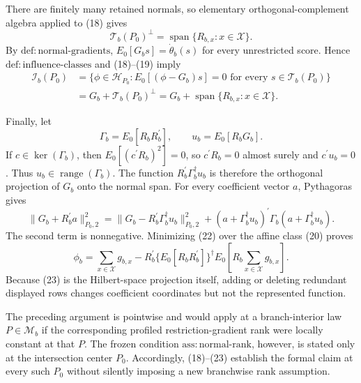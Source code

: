 There are finitely many retained normals, so elementary orthogonal-complement algebra applied to (18) gives
\[
 \mathcal T_b(P_0)^{\perp}
 =\operatorname{span}\{R_{b,x}:x\in\mathcal X\}.
 \tag{19}
\]
By \(\mathrm{def{:}normal\text{-}gradients}\), \(E_0[G_bs]=\dot\theta_b(s)\) for every unrestricted score.  Hence \(\mathrm{def{:}influence\text{-}classes}\) and (18)--(19) imply
\[
 \begin{aligned}
 \mathcal I_b(P_0)
 &=\{\phi\in\mathcal H_{P_0}:E_0[(\phi-G_b)s]=0
       \text{ for every }s\in\mathcal T_b(P_0)\}\\
 &=G_b+\mathcal T_b(P_0)^{\perp}
 =G_b+\operatorname{span}\{R_{b,x}:x\in\mathcal X\}.
 \end{aligned}
 \tag{20}
\]

Finally, let
\[
 \Gamma_b=E_0[R_bR_b^{\prime}],
 \qquad
 u_b=E_0[R_bG_b].
 \tag{21}
\]
If \(c\in\ker(\Gamma_b)\), then \(E_0[(c^{\prime}R_b)^2]=0\), so \(c^{\prime}R_b=0\) almost surely and \(c^{\prime}u_b=0\).  Thus \(u_b\in\operatorname{range}(\Gamma_b)\).  The function \(R_b^{\prime}\Gamma_b^{\dagger}u_b\) is therefore the orthogonal projection of \(G_b\) onto the normal span.  For every coefficient vector \(a\), Pythagoras gives
\[
 \|G_b+R_b^{\prime}a\|_{P_0,2}^2
 =\|G_b-R_b^{\prime}\Gamma_b^{\dagger}u_b\|_{P_0,2}^2
 +(a+\Gamma_b^{\dagger}u_b)^{\prime}
   \Gamma_b(a+\Gamma_b^{\dagger}u_b).
 \tag{22}
\]
The second term is nonnegative.  Minimizing (22) over the affine class (20) proves
\[
 \phi_b
 =\sum_{x\in\mathcal X}g_{b,x}
 -R_b^{\prime}\{E_0[R_bR_b^{\prime}]\}^{\dagger}
 E_0\!\left[R_b\sum_{x\in\mathcal X}g_{b,x}\right].
 \tag{23}
\]
Because (23) is the Hilbert-space projection itself, adding or deleting redundant displayed rows changes coefficient coordinates but not the represented function.

The preceding argument is pointwise and would apply at a branch-interior law \(P\in\mathcal M_b\) if the corresponding profiled restriction-gradient rank were locally constant at that \(P\).  The frozen condition \(\mathrm{ass{:}normal\text{-}rank}\), however, is stated only at the intersection center \(P_0\).  Accordingly, (18)--(23) establish the formal claim at every such \(P_0\) without silently imposing a new branchwise rank assumption.
